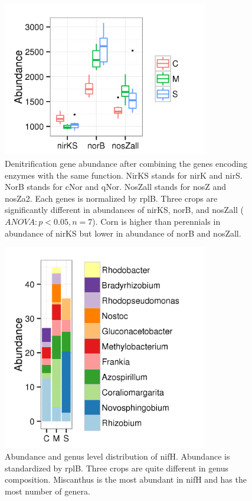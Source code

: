 \documentclass[12pt]{article}
\begin{document}
    \begin{figure}[tbph!]
    \centering
    \includegraphics[width=0.8\textwidth]{figures/xander-denitrify-abun-merge-pair}
    \caption[Denitrification gene abundance]{Denitrification gene abundance after combining the genes encoding enzymes with the same function. NirKS stands for nirK and nirS. NorB stands for cNor and qNor. NosZall stands for nosZ and nosZa2. Each genes is normalized by rplB. Three crops are significantly different in abundances of nirKS, norB, and nosZall ($ANOVA: p < 0.05, n=7$). Corn is higher than perennials in abundance of nirKS but lower in abundance of norB and nosZall.}
    \label{fig:xander-denitrify-abun-merge-pair}
    \end{figure}


    \begin{figure}[tbph!]
    \centering
    \includegraphics[width=0.8\textwidth]{figures/xander-nifH-genus}
    \caption[Abundance and genus level distribution of nifH]{Abundance and genus level distribution of nifH. Abundance is standardized by rplB. Three crops are quite different in genus composition. Miscanthus is the most abundant in nifH and has the most number of genera.}
    \label{fig:xander-nifH-genus}
    \end{figure}
\end{document}
